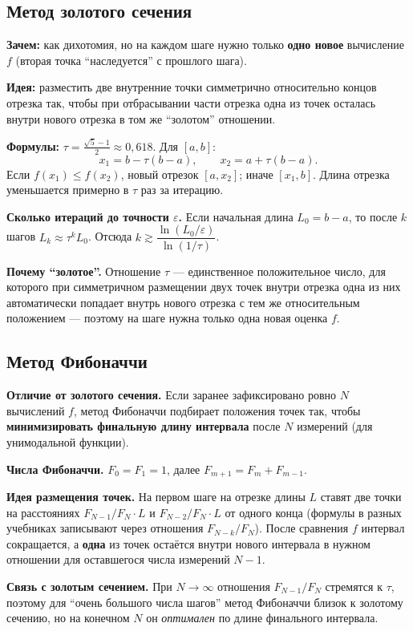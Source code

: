 \documentclass[12pt,a4paper]{article}
\begin{document}
\subsection{Метод золотого сечения}
\textbf{Зачем:} как дихотомия, но на каждом шаге нужно только \textbf{одно новое} вычисление \(f\) (вторая точка ``наследуется'' с прошлого шага).

\textbf{Идея:} разместить две внутренние точки симметрично относительно концов отрезка так, чтобы при отбрасывании части отрезка одна из точек осталась внутри нового отрезка в том же ``золотом'' отношении.

\textbf{Формулы:} \(\tau=\frac{\sqrt5-1}{2}\approx 0{,}618\). Для \([a,b]\):
\[
  x_1=b-\tau(b-a),\qquad x_2=a+\tau(b-a).
\]
Если \(f(x_1)\le f(x_2)\), новый отрезок \([a,x_2]\); иначе \([x_1,b]\). Длина отрезка уменьшается примерно в \(\tau\) раз за итерацию.

\textbf{Сколько итераций до точности \(\varepsilon\).} Если начальная длина \(L_0=b-a\), то после \(k\) шагов \(L_k\approx \tau^k L_0\). Отсюда \(k\gtrsim \dfrac{\ln(L_0/\varepsilon)}{\ln(1/\tau)}\).

\textbf{Почему ``золотое''.} Отношение \(\tau\) --- единственное положительное число, для которого при симметричном размещении двух точек внутри отрезка одна из них автоматически попадает внутрь нового отрезка с тем же относительным положением --- поэтому на шаге нужна только одна новая оценка \(f\).

\subsection{Метод Фибоначчи}
\textbf{Отличие от золотого сечения.} Если заранее зафиксировано ровно \(N\) вычислений \(f\), метод Фибоначчи подбирает положения точек так, чтобы \textbf{минимизировать финальную длину интервала} после \(N\) измерений (для унимодальной функции).

\textbf{Числа Фибоначчи.} \(F_0=F_1=1\), далее \(F_{m+1}=F_m+F_{m-1}\).

\textbf{Идея размещения точек.} На первом шаге на отрезке длины \(L\) ставят две точки на расстояниях \(F_{N-1}/F_N\cdot L\) и \(F_{N-2}/F_N\cdot L\) от одного конца (формулы в разных учебниках записывают через отношения \(F_{N-k}/F_N\)). После сравнения \(f\) интервал сокращается, а \textbf{одна} из точек остаётся внутри нового интервала в нужном отношении для оставшегося числа измерений \(N-1\).

\textbf{Связь с золотым сечением.} При \(N\to\infty\) отношения \(F_{N-1}/F_N\) стремятся к \(\tau\), поэтому для ``очень большого числа шагов'' метод Фибоначчи близок к золотому сечению, но на конечном \(N\) он \emph{оптимален} по длине финального интервала.
\end{document}
